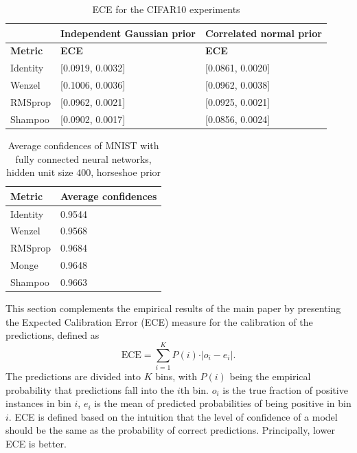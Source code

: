 \documentclass[10pt]{article} %
\theoremstyle{plain}
\theoremstyle{definition}
\theoremstyle{remark}
\begin{document}
\begin{table}[t]
\begin{center}
\begin{tabular}{l|l|l}
  & Independent Gaussian prior &
 Correlated normal prior \\
\hline
{\bf Metric}                   & {\bf ECE}
& {\bf ECE} \\
\hline 
Identity & [0.0919, 0.0032] & [0.0861, 0.0020] \\
Wenzel & [0.1006, 0.0036] & [0.0962, 0.0038] \\
RMSprop & [0.0962, 0.0021] & [0.0925, 0.0021] \\
Shampoo & [0.0902, 0.0017] & [0.0856, 0.0024] \\
\hline
\end{tabular}
\caption{ECE for the CIFAR10 experiments}
\label{table:cifar10eces}
\end{center}
\end{table}

\begin{table}
\begin{center}
\begin{tabular}{l|l}
{\bf Metric} & {\bf Average confidences}\\
\hline
Identity & 0.9544 \\
Wenzel & 0.9568 \\ 
RMSprop & 0.9684 \\
Monge & 0.9648 \\
Shampoo & 0.9663 \\
\hline
\end{tabular}
\caption{Average confidences of MNIST with fully connected neural networks, hidden unit size $400$, horseshoe prior}
\label{table:mnistconfs}
\end{center}
\end{table}

This section complements the empirical results of the main paper by presenting the Expected Calibration Error (ECE) \citep{Naeini2015} measure for the calibration of the predictions, defined as
\begin{equation*}
\text{ECE} = \sum_{i=1}^{K}P(i) \cdot \vert o_{i}-e_{i} \vert.
\end{equation*}
The predictions are divided into $K$ bins, with $P(i)$ being the empirical probability that predictions fall into the $i$th bin. $o_{i}$ is the true fraction of positive instances in bin $i$, $e_{i}$ is the mean of predicted probabilities of being positive in bin $i$. ECE is defined based on the intuition that the level of confidence of a model should be the same as the probability of correct predictions. Principally, lower ECE is better.
\end{document}
